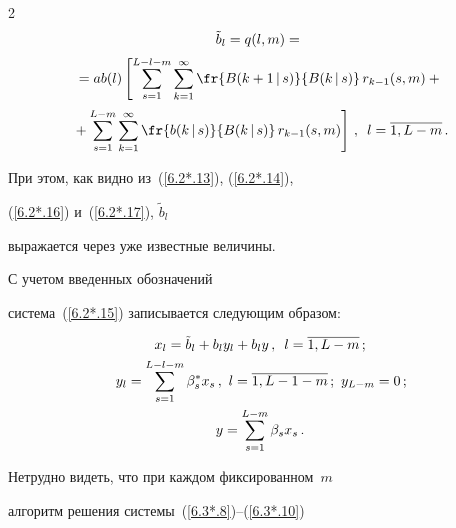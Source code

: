\begin{multicols}{2}
\begin{multline*}


\tilde b_l=q(l,m)={}\\[2pt]


{}=a b(l)\left[\sum\limits_{s=1}^{L-l-m}


\sum\limits_{k=1}^\infty\fr{B(k+1\,|\,s) }{B(k\,|\,s)}\,


r_{k-1}(s,m) +


{}\right.\\[2pt]


\left.{}+


\sum\limits_{s=1}^{L-m} \sum\limits_{k=1}^\infty


\fr{b(k\,|\,s)}{ B(k\,|\,s)}\,


r_{k-1}(s,m)


\right]\,,\enskip l=\overline{1,L-m}\,.


\end{multline*}


При этом, как видно из~(\ref{6.2*.13}), (\ref{6.2*.14}),


(\ref{6.2*.16}) и~(\ref{6.2*.17}), $\tilde b_l$


выражается через уже известные величины.





С учетом введенных обозначений


сис\-те\-ма~(\ref{6.2*.15}) записывается сле\-ду\-ющим об\-разом:


\begin{gather}


\label{6.3*.8}


x_{l}= \tilde b_l + b_l y_l + b_l y \,,\enskip l=\overline{1,L-m}\,;


\\


\!y_l = \sum\limits_{s=1}^{L-l-m} \beta^*_s x_s\,,\


l=\overline{1,L-1-m}\,;\  y_{L-m} = 0\,;\!\!


\label{6.3*.9}


\\


\label{6.3*.10}


y= \sum\limits_{s=1}^{L-m} \beta_s x_s \,.


\end{gather}





Нетрудно видеть, что при каждом фиксированном~$m$


алгоритм решения сис\-те\-мы~(\ref{6.3*.8})--(\ref{6.3*.10})



\end{multicols}
